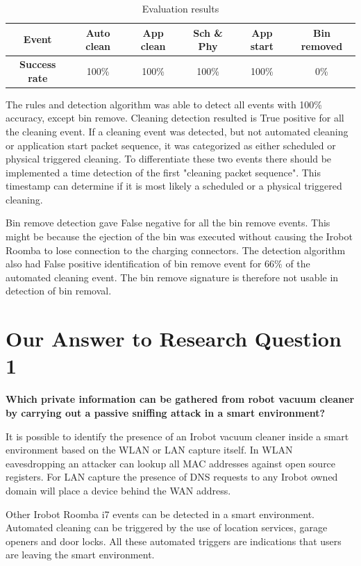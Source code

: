 \begin{table}[H]
\small
\centering
\caption{Evaluation results}
\label{tab:Evaluation results}
\begin{tabular}{|c|c|c|c|c|c|}
\hline
\textbf{Event}        & Auto clean & App clean & Sch \& Phy & App start & Bin removed \\ \hline
\textbf{Success rate} & 100\%           & 100\%             & 100\% & 100\%             & 0\%         \\ \hline
\end{tabular}
\end{table}

The rules and detection algorithm was able to detect all events with 100\% accuracy, except bin remove. Cleaning detection resulted is True positive for all the cleaning event. If a cleaning event was detected, but not automated cleaning or application start packet sequence, it was categorized as either scheduled or physical triggered cleaning. To differentiate these two events there should be implemented a time detection of the first "cleaning packet sequence". This timestamp can determine if it is most likely a scheduled or a physical triggered cleaning. 

Bin remove detection gave False negative for all the bin remove events. This might be because the ejection of the bin was executed without causing the Irobot Roomba to lose connection to the charging connectors. The detection algorithm also had False positive identification of bin remove event for 66\% of the automated cleaning event. The bin remove signature is therefore not usable in detection of bin removal. 


\section{Our Answer to Research Question 1}
\textbf{Which private information can be gathered from robot vacuum cleaner by carrying out a passive sniffing attack in a smart environment?}

It is possible to identify the presence of an Irobot vacuum cleaner inside a smart environment based on the WLAN or LAN capture itself. In WLAN eavesdropping an attacker can lookup all  MAC addresses against open source registers. For LAN capture the presence of DNS requests to any Irobot owned domain will place a device behind the WAN address.

Other Irobot Roomba i7 events can be detected in a smart environment. Automated cleaning can be triggered by the use of location services, garage openers and door locks. All these automated triggers are indications that users are leaving the smart environment. 

